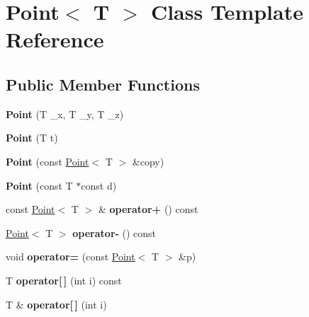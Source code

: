 \hypertarget{class_point}{}\section{Point$<$ T $>$ Class Template Reference}
\label{class_point}
\subsection*{Public Member Functions}
\begin{DoxyCompactItemize}
\item 
\mbox{\label{class_point_a6ce7387594e7666ef7d2b93b3863bc09}} 
{\bfseries Point} (T \+\_\+x, T \+\_\+y, T \+\_\+z)
\item 
\mbox{\label{class_point_a044f4b8ff3ca7b08149d84494ac0d44d}} 
{\bfseries Point} (T t)
\item 
\mbox{\label{class_point_a72a2dedfcf9feb45386ae5ddd2e804a2}} 
{\bfseries Point} (const \mbox{\hyperlink{class_point}{Point}}$<$ T $>$ \&copy)
\item 
\mbox{\label{class_point_aadcff04c7d25f710f055f5c39bf51ce4}} 
{\bfseries Point} (const T $\ast$const d)
\item 
\mbox{\label{class_point_aa2f4ebb2566d56de03ad68f5464cb55f}} 
const \mbox{\hyperlink{class_point}{Point}}$<$ T $>$ \& {\bfseries operator+} () const
\item 
\mbox{\label{class_point_ad18fdce9383ee0e6ffae43242897ffd4}} 
\mbox{\hyperlink{class_point}{Point}}$<$ T $>$ {\bfseries operator-\/} () const
\item 
\mbox{\label{class_point_af475c5c61ad5db9f261fecdd20da3af6}} 
void {\bfseries operator=} (const \mbox{\hyperlink{class_point}{Point}}$<$ T $>$ \&p)
\item 
\mbox{\label{class_point_ab6ba1ea7d23f5398006e123abfd1bf6e}} 
T {\bfseries operator\mbox{[}$\,$\mbox{]}} (int i) const
\item 
\mbox{\label{class_point_ad678b61ba9ebd74c4a7ce6d19b37d52b}} 
T \& {\bfseries operator\mbox{[}$\,$\mbox{]}} (int i)

\end{DoxyCompactItemize}
